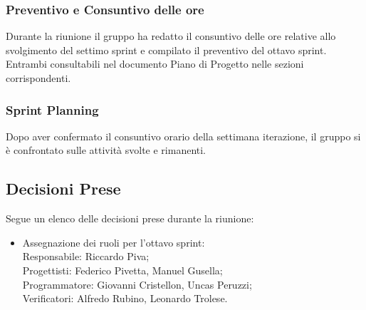 \documentclass[10pt]{article}
\begin{document}
\subsubsection{Preventivo e Consuntivo delle ore}
Durante la riunione il gruppo ha redatto il consuntivo delle ore relative allo svolgimento del settimo sprint e compilato il preventivo del ottavo sprint. Entrambi consultabili nel documento Piano di Progetto nelle sezioni corrispondenti.\\

\subsubsection{Sprint Planning}
Dopo aver confermato il consuntivo orario della settimana iterazione, il gruppo si è confrontato sulle attività svolte e rimanenti.

\subsection{Decisioni Prese}
Segue un elenco delle decisioni prese durante la riunione:
\begin{itemize}
    \item   Assegnazione dei ruoli per l'ottavo sprint:\\
            Responsabile: Riccardo Piva;\\
            Progettisti: Federico Pivetta, Manuel Gusella;\\
            Programmatore: Giovanni Cristellon, Uncas Peruzzi;\\
            Verificatori: Alfredo Rubino, Leonardo Trolese.
\end{itemize}
\end{document}
